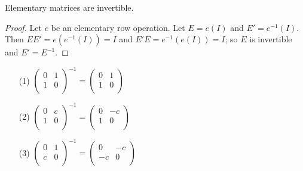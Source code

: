 \begin{theorem}\label{1.5.3}
    Elementary matrices are invertible.
\end{theorem}
\begin{proof}
    Let $e$ be an elementary row operation. Let  $E=e(I)$ and $E'=e^{-1}(I)$. Then
    $EE'=e(e^{-1}(I))=I$ and $E'E=e^{-1}(e(I))=I$; so $E$ is invertible and  $E'=E^{-1}$.
\end{proof}

\begin{example}
    \begin{enumerate}
        \item[(1)] $\begin{pmatrix}
                    0 & 1 \\
                    1 & 0 \\
            \end{pmatrix}^{-1}=
            \begin{pmatrix}
                    0 & 1 \\
                    1 & 0 \\
            \end{pmatrix}$


        \item[(2)] $\begin{pmatrix}
                    0 & c \\
                    1 & 0 \\
            \end{pmatrix}^{-1}=
            \begin{pmatrix}
                    0 & -c \\
                    1 & 0 \\
            \end{pmatrix}$

        \item[(3)] $\begin{pmatrix}
                    0 & 1 \\
                    c & 0 \\
            \end{pmatrix}^{-1}=
            \begin{pmatrix}
                     0 & -c \\
                    -c & 0 \\
            \end{pmatrix}$


\end{enumerate}
\end{example}
